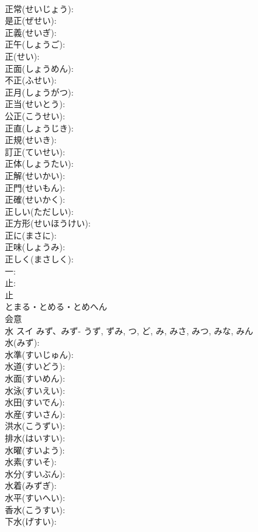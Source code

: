 \documentclass[8pt]{extreport}
\begin{document}
\begin{CJK}{UTF8}{min}
\\	正常(せいじょう): 
\\	是正(ぜせい): 
\\	正義(せいぎ): 
\\	正午(しょうご): 
\\	正(せい): 
\\	正面(しょうめん): 
\\	不正(ふせい): 
\\	正月(しょうがつ): 
\\	正当(せいとう): 
\\	公正(こうせい): 
\\	正直(しょうじき): 
\\	正規(せいき): 
\\	訂正(ていせい): 
\\	正体(しょうたい): 
\\	正解(せいかい): 
\\	正門(せいもん): 
\\	正確(せいかく): 
\\	正しい(ただしい): 
\\	正方形(せいほうけい): 
\\	正に(まさに): 
\\	正味(しょうみ): 
\\	正しく(まさしく): 
\\	一: 
\\	止: 
\\	止	
\\	とまる・とめる・とめへん	
\\	会意 
\\	水	スイ	みず、みず-	うず, ずみ, つ, ど, み, みさ, みつ, みな, みん	
\\	水(みず): 
\\	水準(すいじゅん): 
\\	水道(すいどう): 
\\	水面(すいめん): 
\\	水泳(すいえい): 
\\	水田(すいでん): 
\\	水産(すいさん): 
\\	洪水(こうずい): 
\\	排水(はいすい): 
\\	水曜(すいよう): 
\\	水素(すいそ): 
\\	水分(すいぶん): 
\\	水着(みずぎ): 
\\	水平(すいへい): 
\\	香水(こうすい): 
\\	下水(げすい): 

\end{CJK}
\end{document}
